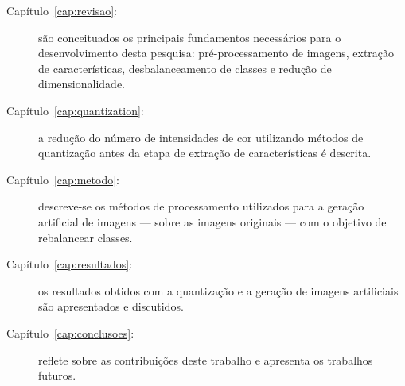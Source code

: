 \begin{description}
\item [Capítulo~\ref{cap:revisao}:] são conceituados os principais fundamentos necessários para o desenvolvimento desta pesquisa: pré-processamento de imagens, extração de características, desbalanceamento de classes e redução de dimensionalidade.

\item [Capítulo~\ref{cap:quantization}:] a redução do número de intensidades de cor utilizando métodos de quantização antes da etapa de extração de características é descrita.

\item [Capítulo~\ref{cap:metodo}:] descreve-se os métodos de processamento utilizados para a geração artificial de imagens --- sobre as imagens originais --- com o objetivo de rebalancear classes.

\item [Capítulo~\ref{cap:resultados}:] os resultados obtidos com a quantização e a geração de imagens artificiais são apresentados e discutidos.

\item [Capítulo~\ref{cap:conclusoes}:] reflete sobre as contribuições deste trabalho e apresenta os trabalhos futuros.

\end{description}
